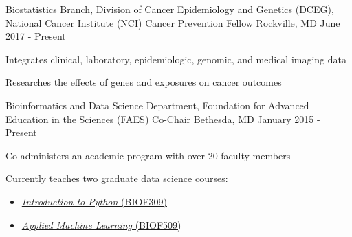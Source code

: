 \vspace{0.1cm}
\begin{cventries}
  \cventry
    {Biostatistics Branch, Division of Cancer Epidemiology and Genetics (DCEG), National Cancer Institute (NCI)}  %
    {Cancer Prevention Fellow} %
    {Rockville, MD} %
    {June 2017 - Present} %
    {
      \begin{cvitems} %
      \item Integrates clinical, laboratory, epidemiologic, genomic, and medical imaging data
\item Researches the effects of genes and exposures on cancer outcomes
      \end{cvitems}
    }

  \cventry
    {Bioinformatics and Data Science Department, Foundation for Advanced Education in the Sciences (FAES)}  %
    {Co-Chair} %
    {Bethesda, MD} %
    {January 2015 - Present} %
    {
      \begin{cvitems} %
        \item Co-administers an academic program with over 20 faculty members
        \item {Currently teaches two graduate data science courses: \\
            \begin{minipage}[t]{0.30\textwidth}
             \begin{itemize}
                  \item{ \href{https://github.com/biof309}{\textcolor{awesome-skyblue}{\textit{Introduction to Python} (BIOF309)}}}
            \end{itemize}
            \end{minipage}
            \begin{minipage}[t]{0.35\textwidth}
             \begin{itemize}
                  \item{ \href{https://biof509.github.io/}{\textcolor{awesome-skyblue}{\textit{Applied Machine Learning} (BIOF509)}}}
             \end{itemize}
            \end{minipage}
             }
      \end{cvitems}
    }
    

\end{cventries}
